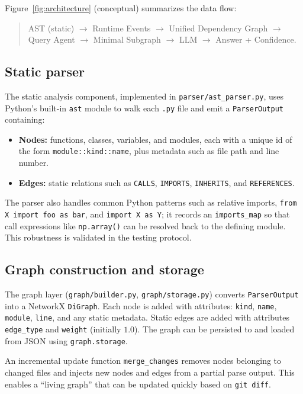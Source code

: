 \documentclass[11pt]{article}
\begin{document}
Figure~\ref{fig:architecture} (conceptual) summarizes the data flow:

\begin{quote}
AST (static) $\rightarrow$ Runtime Events $\rightarrow$ Unified Dependency Graph $\rightarrow$ Query Agent $\rightarrow$ Minimal Subgraph $\rightarrow$ LLM $\rightarrow$ Answer + Confidence.
\end{quote}

\subsection{Static parser}

The static analysis component, implemented in \texttt{parser/ast\_parser.py}, uses Python's built-in \texttt{ast} module to walk each \texttt{.py} file and emit a \texttt{ParserOutput} containing:
\begin{itemize}
  \item \textbf{Nodes:} functions, classes, variables, and modules, each with a unique id of the form \texttt{module::kind::name}, plus metadata such as file path and line number.
  \item \textbf{Edges:} static relations such as \texttt{CALLS}, \texttt{IMPORTS}, \texttt{INHERITS}, and \texttt{REFERENCES}.
\end{itemize}

The parser also handles common Python patterns such as relative imports, \texttt{from X import foo as bar}, and \texttt{import X as Y}; it records an \texttt{imports\_map} so that call expressions like \texttt{np.array()} can be resolved back to the defining module.
This robustness is validated in the testing protocol.

\subsection{Graph construction and storage}

The graph layer (\texttt{graph/builder.py}, \texttt{graph/storage.py}) converts \texttt{ParserOutput} into a NetworkX \texttt{DiGraph}.
Each node is added with attributes:
\texttt{kind}, \texttt{name}, \texttt{module}, \texttt{line}, and any static metadata.
Static edges are added with attributes \texttt{edge\_type} and \texttt{weight} (initially $1.0$).
The graph can be persisted to and loaded from JSON using \texttt{graph.storage}.

An incremental update function \texttt{merge\_changes} removes nodes belonging to changed files and injects new nodes and edges from a partial parse output.
This enables a ``living graph'' that can be updated quickly based on \texttt{git diff}.
\end{document}
